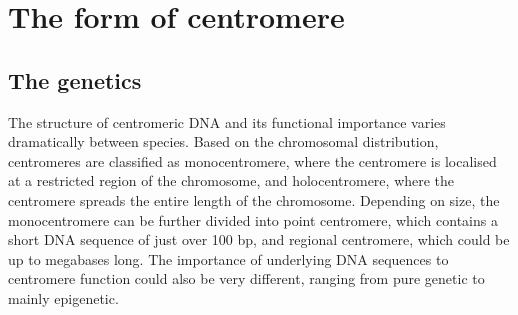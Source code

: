 \section{The form of centromere}
\subsection{The genetics}

The structure of centromeric DNA and its functional importance varies dramatically between species. Based on the chromosomal distribution, centromeres are classified as monocentromere, where the centromere is localised at a restricted region of the chromosome, and holocentromere, where the centromere spreads the entire length of the chromosome. Depending on size, the monocentromere can be further divided into point centromere, which contains a short DNA sequence of just over 100 bp, and regional centromere, which could be up to megabases long. The importance of underlying DNA sequences to centromere function could also be very different, ranging from pure genetic to mainly epigenetic. 

